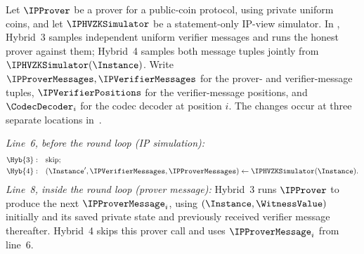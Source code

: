 \begin{lemma}
  \label{lem:dsfs_zk_hyb3_hyb4}
  Let \(\IPProver\) be a prover for a public-coin protocol, using private uniform coins, and let \(\IPHVZKSimulator\) be a statement-only IP-view simulator. In , Hybrid~3 samples independent uniform verifier messages and runs the honest prover against them; Hybrid~4 samples both message tuples jointly from \(\IPHVZKSimulator(\Instance)\). Write \(\IPProverMessages,\IPVerifierMessages\) for the prover- and verifier-message tuples, \(\IPVerifierPositions\) for the verifier-message positions, and \(\CodecDecoder_i\) for the codec decoder at position \(i\). The changes occur at three separate locations in~\cite[Figure~5]{CO25}.

  \emph{Line~6, before the round loop (IP simulation):}
  \begin{equation*}
  \begin{aligned}
    \Hyb{3}:\quad &\text{skip};\\
    \Hyb{4}:\quad &(\Instance',\IPVerifierMessages,\IPProverMessages)\leftarrow\IPHVZKSimulator(\Instance).
  \end{aligned}
  \end{equation*}
  \emph{Line~8, inside the round loop (prover message):} Hybrid~3 runs \(\IPProver\) to produce the next \(\IPProverMessage_i\), using \((\Instance,\WitnessValue)\) initially and its saved private state and previously received verifier message thereafter. Hybrid~4 skips this prover call and uses \(\IPProverMessage_i\) from line~6.


\end{lemma}
